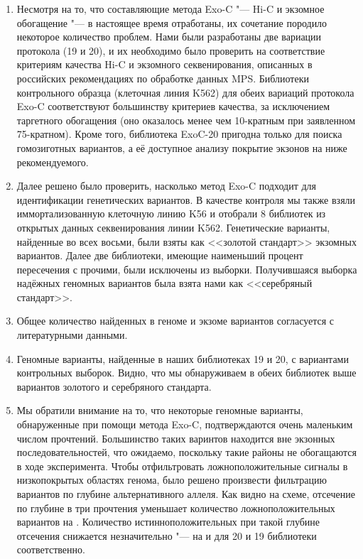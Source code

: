 \documentclass[a4paper,14pt]{extarticle}
\begin{document}
\begin{enumerate}
\item Несмотря на то, что составляющие метода Exo-C "--- Hi-C и экзомное обогащение "--- в настоящее время отработаны, их сочетание породило некоторое количество проблем.
Нами были разработаны две вариации протокола (19 и 20), и их необходимо было проверить на соответствие критериям качества Hi-C и экзомного секвенирования, описанных в российских рекомендациях по обработке данных MPS.
Библиотеки контрольного образца (клеточная линия K562) для обеих вариаций протокола Exo-C соответствуют большинству критериев качества, за исключением таргетного обогащения (оно оказалось менее чем 10-кратным при заявленном 75-кратном). Кроме того, библиотека ExoC-20 пригодна только для поиска гомозиготных вариантов, а её доступное анализу покрытие экзонов на  ниже рекомендуемого.

\item Далее решено было проверить, насколько метод Exo-C подходит для идентификации генетических вариантов.
В качестве контроля мы также взяли иммортализованную клеточную линию K56 и отобрали 8 библиотек из открытых данных секвенирования линии K562.
Генетические варианты, найденные во всех восьми, были взяты как <<золотой стандарт>> экзомных вариантов.
Далее две библиотеки, имеющие наименьший процент пересечения с прочими, были исключены из выборки.
Получившаяся выборка надёжных геномных вариантов была взята нами как <<серебряный стандарт>>.

\item Общее количество найденных в геноме и экзоме вариантов согласуется с литературными данными.

\item Геномные варианты, найденные в наших библиотеках 19 и 20, с вариантами контрольных выборок. Видно, что мы обнаруживаем в обеих библиотек выше  вариантов золотого и серебряного стандарта.

\item Мы обратили внимание на то, что некоторые геномные варианты, обнаруженные при помощи метода Exo-C, подтверждаются очень маленьким числом прочтений.
Большинство таких варинтов находится вне экзонных последовательностей, что ожидаемо, поскольку такие районы не обогащаются в ходе эксперимента.
Чтобы отфильтровать ложноположительные сигналы в низкопокрытых областях генома, было решено произвести фильтрацию вариантов по глубине альтернативного аллеля.
Как видно на схеме, отсечение по глубине в три прочтения уменьшает количество ложноположительных вариантов на .
Количество истинноположительных при такой глубине отсечения снижается незначительно "--- на  и  для 20 и 19 библиотеки соответственно.


\end{enumerate}
\end{document}
